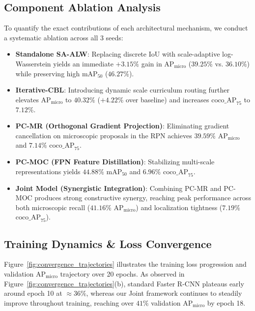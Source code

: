 \subsection{Component Ablation Analysis}
To quantify the exact contributions of each architectural mechanism, we conduct a systematic ablation across all 3 seeds:
\begin{itemize}
    \item \textbf{Standalone SA-ALW}: Replacing discrete IoU with scale-adaptive log-Wasserstein yields an immediate $+3.15\%$ gain in $\mathrm{AP}_{\mathrm{micro}}$ ($39.25\%$ vs. $36.10\%$) while preserving high $\mathrm{mAP}_{50}$ ($46.27\%$).
    \item \textbf{Iterative-CBL}: Introducing dynamic scale curriculum routing further elevates $\mathrm{AP}_{\mathrm{micro}}$ to $40.32\%$ ($+4.22\%$ over baseline) and increases $\mathrm{coco\_AP}_{75}$ to $7.12\%$.
    \item \textbf{PC-MR (Orthogonal Gradient Projection)}: Eliminating gradient cancellation on microscopic proposals in the RPN achieves $39.59\%$ $\mathrm{AP}_{\mathrm{micro}}$ and $7.14\%$ $\mathrm{coco\_AP}_{75}$.
    \item \textbf{PC-MOC (FPN Feature Distillation)}: Stabilizing multi-scale representations yields $44.88\%$ $\mathrm{mAP}_{50}$ and $6.96\%$ $\mathrm{coco\_AP}_{75}$.
    \item \textbf{Joint Model (Synergistic Integration)}: Combining PC-MR and PC-MOC produces strong constructive synergy, reaching peak performance across both microscopic recall ($\mathbf{41.16\%}$ $\mathrm{AP}_{\mathrm{micro}}$) and localization tightness ($\mathbf{7.19\%}$ $\mathrm{coco\_AP}_{75}$).
\end{itemize}

\subsection{Training Dynamics \& Loss Convergence}
Figure~\ref{fig:convergence_trajectories} illustrates the training loss progression and validation $\mathrm{AP}_{\mathrm{micro}}$ trajectory over 20 epochs. As observed in Figure~\ref{fig:convergence_trajectories}(b), standard Faster R-CNN plateaus early around epoch 10 at $\approx 36\%$, whereas our Joint framework continues to steadily improve throughout training, reaching over $41\%$ validation $\mathrm{AP}_{\mathrm{micro}}$ by epoch 18.
